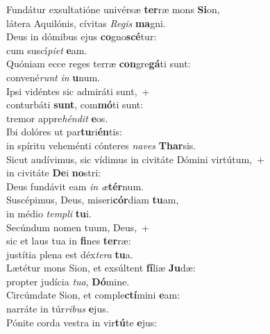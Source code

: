 \evenverse Fundátur exsultatióne univérsæ \textbf{ter}ræ mons \textbf{Si}on,~\*\\
\evenverse látera Aquilónis, cívitas \textit{Re}\textit{gis} \textbf{ma}gni.\\
\oddverse Deus in dómibus ejus \textbf{co}gno\textbf{scé}tur:~\*\\
\oddverse cum suscí\textit{pi}\textit{et} \textbf{e}am.\\
\evenverse Quóniam ecce reges terræ \textbf{con}gre\textbf{gá}ti sunt:~\*\\
\evenverse convené\textit{runt} \textit{in} \textbf{u}num.\\
\oddverse Ipsi vidéntes sic admiráti sunt,~+\\
\oddverse  conturbáti \textbf{sunt}, com\textbf{mó}ti sunt:~\*\\
\oddverse tremor appre\textit{hén}\textit{dit} \textbf{e}os.\\
\evenverse Ibi dolóres ut par\textbf{tu}ri\textbf{én}tis:~\*\\
\evenverse in spíritu veheménti cónteres \textit{na}\textit{ves} \textbf{Thar}sis.\\
\oddverse Sicut audívimus, sic vídimus in civitáte Dómini virtútum,~+\\
\oddverse  in civitáte \textbf{De}i \textbf{no}stri:~\*\\
\oddverse Deus fundávit eam \textit{in} \textit{æ}\textbf{tér}num.\\
\evenverse Suscépimus, Deus, miseri\textbf{cór}diam \textbf{tu}am,~\*\\
\evenverse in médio \textit{tem}\textit{pli} \textbf{tu}i.\\
\oddverse Secúndum nomen tuum, Deus,~+\\
\oddverse  sic et laus tua in \textbf{fi}nes \textbf{ter}ræ:~\*\\
\oddverse justítia plena est déx\textit{te}\textit{ra} \textbf{tu}a.\\
\evenverse Lætétur mons Sion, et exsúltent \textbf{fí}liæ \textbf{Ju}dæ:~\*\\
\evenverse propter judícia \textit{tu}\textit{a}, \textbf{Dó}mine.\\
\oddverse Circúmdate Sion, et comple\textbf{ctí}mini \textbf{e}am:~\*\\
\oddverse narráte in túr\textit{ri}\textit{bus} \textbf{e}jus.\\
\evenverse Pónite corda vestra in vir\textbf{tú}te \textbf{e}jus:~\*\\
